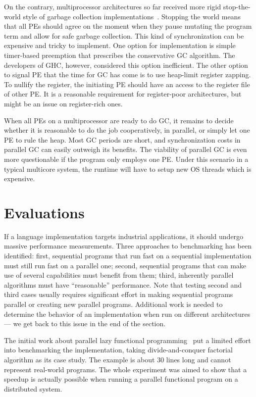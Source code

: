 \documentclass[11pt]{extarticle}
\begin{document}
On the contrary, multiprocessor architectures so far received more rigid stop-the-world style of garbage collection implementations~\cite{Marlow09}. Stopping the world means that all PEs should agree on the moment when they pause mutating the program term and allow for safe garbage collection. This kind of synchronization can be expensive and tricky to implement. One option for implementation is simple timer-based preemption that prescribes the conservative GC algorithm. The developers of GHC, however, considered this option inefficient. The other option to signal PE that the time for GC has come is to use heap-limit register zapping. To nullify the register, the initiating PE should have an access to the register file of other PE. It is a reasonable requirement for register-poor architectures, but might be an issue on register-rich ones.

When all PEs on a multiprocessor are ready to do GC, it remains to decide whether it is reasonable to do the job cooperatively, in parallel, or simply let one PE to rule the heap. Most GC periods are short, and synchronization costs in parallel GC can easily outweigh its benefits. The viability of parallel GC is even more questionable if the program only employs one PE. Under this scenario in a typical multicore system, the runtime will have to setup new OS threads which is expensive.

\section{Evaluations}

If a language implementation targets industrial applications, it should undergo massive performance measurements. Three approaches to benchmarking has been identified: first, sequential programs that run fast on a sequential implementation must still run fast on a parallel one; second, sequential programs that can make use of several capabilities must benefit from them; third, inherently parallel algorithms must have ``reasonable'' performance. Note that testing second and third cases usually requires significant effort in making sequential programs parallel or creating new parallel programs. Additional work is needed to determine the behavior of an implementation when run on different architectures — we get back to this issue in the end of the section.

The initial work about parallel lazy functional programming~\cite{Trinder96} put a limited effort into benchmarking the implementation, taking divide-and-conquer factorial algorithm as its case study. The example is about 30 lines long and cannot represent real-world programs. The whole experiment was aimed to show that a speedup is actually possible when running a parallel functional program on a distributed system.
\end{document}
